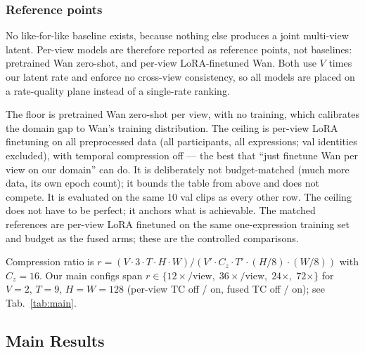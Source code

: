 \subsubsection{Reference points}

No like-for-like baseline exists, because nothing else produces a joint multi-view latent. Per-view models are therefore reported as reference points, not baselines: pretrained Wan zero-shot, and per-view LoRA-finetuned Wan. Both use $V$ times our latent rate and enforce no cross-view consistency, so all models are placed on a rate-quality plane instead of a single-rate ranking.

The floor is pretrained Wan zero-shot per view, with no training, which calibrates the domain gap to Wan's training distribution. The ceiling is per-view LoRA finetuning on all preprocessed data (all participants, all expressions; val identities excluded), with temporal compression off --- the best that ``just finetune Wan per view on our domain'' can do. It is deliberately not budget-matched (much more data, its own epoch count); it bounds the table from above and does not compete. It is evaluated on the same 10 val clips as every other row. The ceiling does not have to be perfect; it anchors what is achievable. The matched references are per-view LoRA finetuned on the same one-expression training set and budget as the fused arms; these are the controlled comparisons.

Compression ratio is $r = (V \cdot 3 \cdot T \cdot H \cdot W) / (V' \cdot C_z \cdot T' \cdot (H/8) \cdot (W/8))$ with $C_z = 16$. Our main configs span $r \in \{12{\times}/\text{view},\; 36{\times}/\text{view},\; 24{\times},\; 72{\times}\}$ for $V{=}2$, $T{=}9$, $H{=}W{=}128$ (per-view TC off / on, fused TC off / on); see Tab.~\ref{tab:main}.

\subsection{Main Results}


